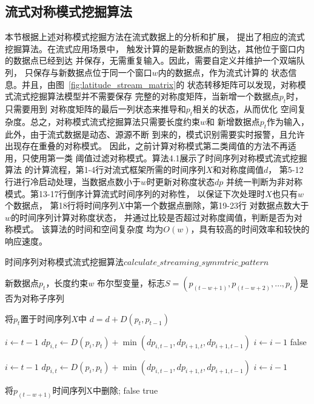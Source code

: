 \subsection{流式对称模式挖掘算法}
本节根据上述对称模式挖掘方法在流式数据上的分析和扩展，
提出了相应的流式挖掘算法。在流式应用场景中，
触发计算的是新数据点的到达，其他位于窗口内的数据点已经到达
并保存，无需重复输入。因此，需要自定义并维护一个双端队列，
只保存与新数据点位于同一个窗口$w$内的数据点，作为流式计算的
状态信息。并且，由图~\ref{fig:latitude_stream_matrix}的
状态转移矩阵可以发现，对称模式流式挖掘算法模型并不需要保存
完整的对称度矩阵，当新增一个数据点$p_t$时，只需要用到
对称度矩阵的最后一列状态来推导和$p_t$相关的状态，从而优化
空间复杂度。总之，对称模式流式挖掘算法只需要长度约束$w$和
新增数据点$p_t$作为输入，此外，由于流式数据是动态、源源不断
到来的，模式识别需要实时报警，且允许出现存在重叠的对称模式。
因此，之前计算对称模式第二类阈值的方法不再适用，只使用第一类
阈值过滤对称模式。算法4.1展示了时间序列对称模式流式挖掘算法
的计算流程，第1-4行对流式框架所需的时间序列$X$和对称度阈值$d$，
第5-12行进行冷启动处理，当数据点数小于$w$时更新对称度状态$dp$
并统一判断为非对称模式。第13-17行倒序计算流式时间序列的对称性，
以保证下次处理时$X$也只有$w$个数据点，
第18行将时间序列$X$中第一个数据点删除，第19-23行
对数据点数大于$w$的时间序列计算对称度状态，
并通过比较是否超过对称度阈值，判断是否为对称模式。
该算法的时间和空间复杂度
均为$O\left(w\right)$，具有较高的时间效率和较快的响应速度。

\renewcommand{\algorithmicrequire}{\textbf{输入：}\unskip}
\renewcommand{\algorithmicensure}{\textbf{输出：}\unskip}

\begin{algorithm}
  \caption{时间序列对称模式流式挖掘算法$calculate\_streaming\_symmtric\_pattern$}
  \label{alg:streaming_symmetric_pattern}
  \small
  \begin{algorithmic}
    \REQUIRE 新数据点$p_t$，长度约束$w$
    \ENSURE 布尔型变量，标志$S=\left(p_(t-w+1),p_(t-w+2),…,p_t \right)$是否为对称子序列

    \STATE 将$p_t$置于时间序列$X$中
      \STATE $d=d+D\left(p_{t}, p_{t-1}\right)$
    \ENDIF

      \STATE $i \leftarrow t-1$
        \STATE $dp_{i,t} \leftarrow D\left(p_{i}, p_{t} \right) + \min \left(dp_{i,t-1},dp_{i+1,t},dp_{i+1,t-1}\right)$
        \STATE $i \leftarrow i-1$
      \ENDWHILE
      \RETURN false
    \ENDIF

    \STATE $i \leftarrow t-1$
      \STATE $dp_{i,t} \leftarrow D\left(p_{i}, p_{t} \right) + \min \left(dp_{i,t-1},dp_{i+1,t},dp_{i+1,t-1}\right)$
      \STATE $i \leftarrow i-1$
    \ENDWHILE

    \STATE 将$p_(t-w+1)$时间序列X中删除;
      \RETURN false
    \ELSE
      \RETURN true
    \ENDIF
  \end{algorithmic}
\end{algorithm}

